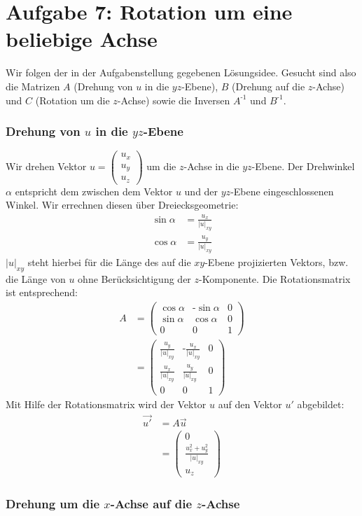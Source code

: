 \documentclass[a4paper]{scrartcl}
\begin{document}
\section*{Aufgabe 7: Rotation um eine beliebige Achse}
Wir folgen der in der Aufgabenstellung gegebenen Lösungsidee. Gesucht sind also die Matrizen $A$ (Drehung von $u$ in die $yz$-Ebene), $B$ (Drehung auf die $z$-Achse) und $C$ (Rotation um die $z$-Achse) sowie die Inversen $A^{\text{-}1}$ und $B^{\text{-}1}$.
\subsubsection*{Drehung von $u$ in die $yz$-Ebene}
Wir drehen Vektor $u=\begin{pmatrix} u_x \\ u_y \\ u_z \end{pmatrix}$ um die $z$-Achse in die $yz$-Ebene. Der Drehwinkel $\alpha$ entspricht dem zwischen dem Vektor $u$ und der $yz$-Ebene eingeschlossenen Winkel. Wir errechnen diesen über Dreiecksgeometrie:
\begin{align*}
\sin\alpha & = \frac{u_x}{\left|u\right|_{xy}} \\
\cos\alpha & = \frac{u_y}{\left|u\right|_{xy}}
\end{align*}
$\left|u\right|_{xy}$ steht hierbei für die Länge des auf die $xy$-Ebene projizierten Vektors, bzw. die Länge von $u$ ohne Berücksichtigung der $z$-Komponente. Die Rotationsmatrix ist entsprechend:
\begin{align*}
A & = \begin{pmatrix} \cos\alpha & \text{-}\sin\alpha & 0 \\ \sin\alpha & \cos\alpha & 0 \\ 0 & 0 & 1 \end{pmatrix}
\\
& = \begin{pmatrix} \frac{u_y}{\left|u\right|_{xy}} & \text{-} \frac{u_x}{\left|u\right|_{xy}} & 0 \\ \frac{u_x}{\left|u\right|_{xy}} & \frac{u_y}{\left|u\right|_{xy}} & 0 \\ 0 & 0 & 1\end{pmatrix}
\end{align*}
Mit Hilfe der Rotationsmatrix wird der Vektor $u$ auf den Vektor $u'$ abgebildet:
\begin{align*}
\vec{u'} & = A\vec{u} \\
& = \begin{pmatrix} 0 \\ \frac{u_x^2 + u_y^2}{\left|u\right|_{xy}} \\ u_z\end{pmatrix}
\end{align*}

\subsubsection*{Drehung um die $x$-Achse auf die $z$-Achse}
\end{document}
